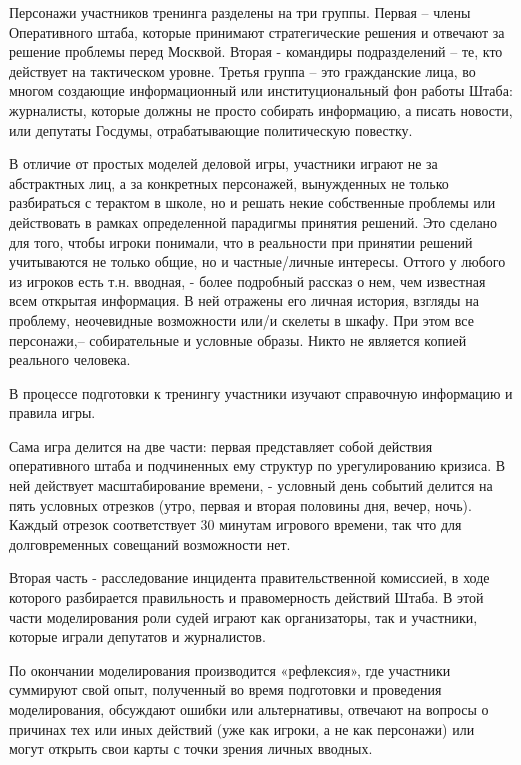 	Персонажи участников тренинга разделены на три группы. Первая –  члены Оперативного штаба, которые принимают стратегические решения и отвечают за решение проблемы перед Москвой. 
	Вторая - командиры подразделений – те, кто действует на тактическом уровне. 
	Третья группа – это гражданские лица, во многом создающие информационный или институциональный фон работы Штаба: журналисты, которые должны не просто собирать информацию, а писать новости, или депутаты Госдумы, отрабатывающие политическую повестку.
	
	В отличие от простых моделей деловой игры, участники играют не за абстрактных лиц, а за конкретных персонажей,  вынужденных не только разбираться с терактом в школе, но и решать некие собственные проблемы или действовать в рамках определенной парадигмы принятия решений. 
	Это сделано для того, чтобы игроки понимали, что в реальности при принятии решений учитываются не только общие, но и частные/личные интересы. 
	Оттого у любого из игроков есть т.н. вводная,  - более подробный рассказ о нем, чем известная всем открытая информация.  
	В ней отражены его личная история,  взгляды на проблему,  неочевидные возможности или/и скелеты в шкафу. При этом все персонажи,– собирательные и условные образы. 
	Никто не является копией реального человека.
	
	В процессе подготовки к тренингу участники изучают справочную информацию и правила игры.
	
	Сама игра  делится на две части: первая представляет собой действия оперативного штаба и подчиненных ему структур по урегулированию кризиса. 
	В ней действует масштабирование времени, - условный день событий делится на пять условных отрезков (утро, первая и вторая половины дня, вечер, ночь). 
	Каждый отрезок соответствует 30 минутам  игрового времени, так что для долговременных  совещаний возможности нет.
	
	Вторая  часть  - расследование инцидента правительственной комиссией, в ходе которого разбирается правильность и правомерность действий Штаба. 
	В этой части моделирования роли судей играют как организаторы, так и участники, которые играли депутатов и журналистов.
	
	По окончании моделирования производится «рефлексия», где участники суммируют свой опыт,  полученный во время подготовки и проведения моделирования, обсуждают ошибки или альтернативы, отвечают на вопросы о причинах тех или иных действий (уже как игроки, а не как персонажи) или могут открыть свои карты с точки зрения личных вводных.

